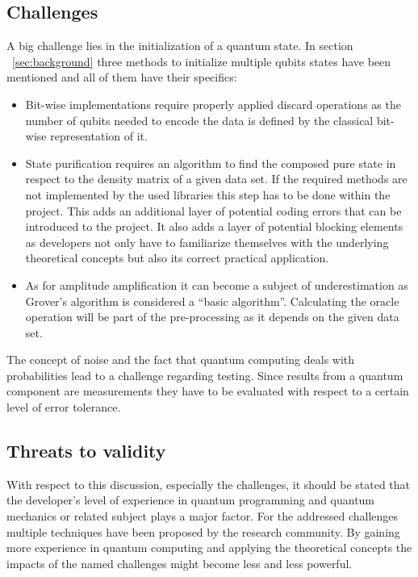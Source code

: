 \subsection{Challenges}
\label{subsec:challenges}
A big challenge lies in the initialization of a quantum state. In section ~\ref{sec:background} three methods to initialize multiple qubits states have been mentioned and all of them have their specifics:
\begin{itemize}
    \item Bit-wise implementations require properly applied discard operations as the number of qubits needed to encode the data is defined by the classical bit-wise representation of it.
    \item State purification requires an algorithm to find the composed pure state in respect to the density matrix of a given data set. If the required methods are not implemented by the used libraries this step has to be done within the project. This adds an additional layer of potential coding errors that can be introduced to the project. It also adds a layer of potential blocking elements as developers not only have to familiarize themselves with the underlying theoretical concepts but also its correct practical application.
    \item As for amplitude amplification it can become a subject of underestimation as Grover's algorithm is considered a \enquote{basic algorithm}. Calculating the oracle operation will be part of the pre-processing as it depends on the given data set.
\end{itemize}

The concept of noise and the fact that quantum computing deals with probabilities lead to a challenge regarding testing. Since results from a quantum component are measurements they have to be evaluated with respect to a certain level of error tolerance.

\subsection{Threats to validity}
\label{subsec:threats}
With respect to this discussion, especially the challenges, it should be stated that the developer's level of experience in quantum programming and quantum mechanics or related subject plays a major factor. For the addressed challenges multiple techniques have been proposed by the research community. By gaining more experience in quantum computing and applying the theoretical concepts the impacts of the named challenges might become less and less powerful.


